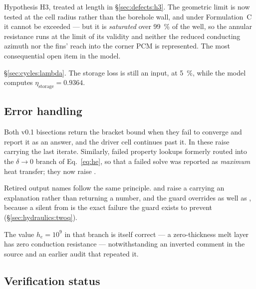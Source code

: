 \begin{description}[leftmargin=1.6em,itemsep=3pt]
\item[Front interaction in the corners between legs.] Hypothesis H3, treated at
  length in \S\ref{sec:defects:h3}. The geometric limit is now tested at the
  cell radius rather than the borehole wall, and under Formulation~C it cannot
  be exceeded --- but it is \emph{saturated} over \SI{99}{\percent} of the well,
  so the annular resistance runs at the limit of its validity and neither the
  reduced conducting azimuth nor the fins' reach into the corner PCM is
  represented. The most consequential open item in the model.
\item[$\lambda$ as an output.] \S\ref{sec:cycles:lambda}. The storage loss is
  still an input, at \SI{5}{\percent}, while the model computes
  $\eta_{\mathrm{storage}}=0.9364$.
\end{description}

\subsection{Error handling}

Both v0.1 bisections return the bracket bound when they fail to converge and
report it as an answer, and the driver cell continues past it. In
 these raise  carrying the last
iterate. Similarly, failed property lookups formerly routed into the
$\delta\to0$ branch of Eq.~\eqref{eq:he}, so that a failed solve was reported as
\emph{maximum} heat transfer; they now raise .

Retired output names follow the same principle.  and
 raise a  carrying an explanation rather than
returning a number, and the guard overrides  as well as
\code{[\,]}, because a silent  from  is the exact
failure the guard exists to prevent (\S\ref{sec:hydraulics:twoq}).

The value $h_{e}=10^{9}$ in that branch is itself correct --- a zero-thickness
melt layer has zero conduction resistance --- notwithstanding an inverted
comment in the source and an earlier audit that repeated it.

\subsection{Verification status}
\label{sec:defects:verification}

